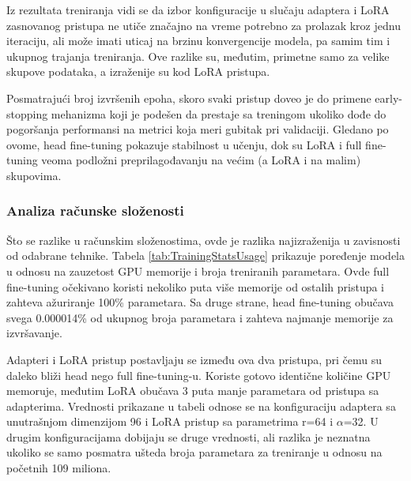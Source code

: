 \documentclass[12pt,oneside]{memoir}
\begin{document}
Iz rezultata treniranja vidi se da izbor konfiguracije u slučaju adaptera i LoRA zasnovanog pristupa ne utiče značajno na vreme potrebno za prolazak kroz jednu iteraciju, ali može imati uticaj na brzinu konvergencije modela, pa samim tim i ukupnog trajanja treniranja.
Ove razlike su, međutim, primetne samo za velike skupove podataka, a izraženije su kod LoRA pristupa.

Posmatrajući broj izvršenih epoha, skoro svaki pristup doveo je do primene early-stopping mehanizma koji je podešen da prestaje sa treningom ukoliko dođe do pogoršanja performansi na metrici koja meri gubitak pri validaciji. Gledano po ovome, head fine-tuning pokazuje stabilnost u učenju, dok su LoRA i full fine-tuning veoma podložni preprilagođavanju na većim (a LoRA i na malim) skupovima.


\subsubsection{Analiza računske složenosti}

Što se razlike u računskim složenostima, ovde je razlika najizraženija u zavisnosti od odabrane tehnike. Tabela \ref{tab:TrainingStatsUsage} prikazuje poređenje modela u odnosu na zauzetost GPU memorije i broja treniranih parametara. Ovde full fine-tuning očekivano koristi nekoliko puta više memorije od ostalih pristupa i zahteva ažuriranje 100\% parametara. Sa druge strane, head fine-tuning obučava svega 0.000014\% od ukupnog broja parametara i zahteva najmanje memorije za izvršavanje. 

Adapteri i LoRA pristup postavljaju se između ova dva pristupa, pri čemu su daleko bliži head nego full fine-tuning-u. Koriste gotovo identične količine GPU memoruje, međutim LoRA obučava 3 puta manje parametara od pristupa sa adapterima. Vrednosti prikazane u tabeli odnose se na konfiguraciju adaptera sa unutrašnjom dimenzijom 96 i LoRA pristup sa parametrima r=64 i \(\alpha\)=32. U drugim konfiguracijama dobijaju se druge vrednosti, ali razlika je neznatna ukoliko se samo posmatra ušteda broja parametara za treniranje u odnosu na početnih 109 miliona.
\end{document}
